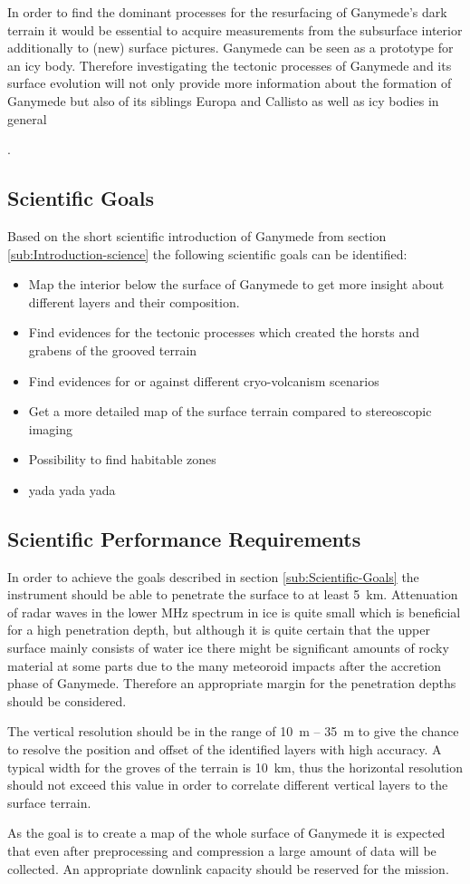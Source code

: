 In order to find the dominant processes for the resurfacing of Ganymede's
dark terrain it would be essential to acquire measurements from the
subsurface interior additionally to (new) surface pictures. Ganymede
can be seen as a prototype for an icy body. Therefore investigating
the tectonic processes of Ganymede and its surface evolution will
not only provide more information about the formation of Ganymede
but also of its siblings Europa and Callisto as well as icy bodies
in general %

.


\subsection{Scientific Goals\label{sub:Scientific-Goals}}

Based on the short scientific introduction of Ganymede from section
\ref{sub:Introduction-science} the following scientific goals can
be identified:
\begin{itemize}
\item Map the interior below the surface of Ganymede to get more insight
about different layers and their composition. 
\item Find evidences for the tectonic processes which created the horsts
and grabens of the grooved terrain
\item Find evidences for or against different cryo-volcanism scenarios
\item Get a more detailed map of the surface terrain compared to stereoscopic
imaging
\item Possibility to find habitable zones 
\item yada yada yada
\end{itemize}

\subsection{Scientific Performance Requirements}

In order to achieve the goals described in section \ref{sub:Scientific-Goals}
the instrument should be able to penetrate the surface to at least
5~km. Attenuation of radar waves in the lower MHz spectrum in ice
is quite small which is beneficial for a high penetration depth, but
although it is quite certain that the upper surface mainly consists
of water ice there might be significant amounts of rocky material
at some parts due to the many meteoroid impacts after the accretion
phase of Ganymede. Therefore an appropriate margin for the penetration
depths should be considered. 

The vertical resolution should be in the range of 10~m -- 35~m to
give the chance to resolve the position and offset of the identified
layers with high accuracy. A typical width for the groves of the terrain
is 10~km, thus the horizontal resolution should not exceed this value
in order to correlate different vertical layers to the surface terrain. 

As the goal is to create a map of the whole surface of Ganymede it
is expected that even after preprocessing and compression a large
amount of data will be collected. An appropriate downlink capacity
should be reserved for the mission.